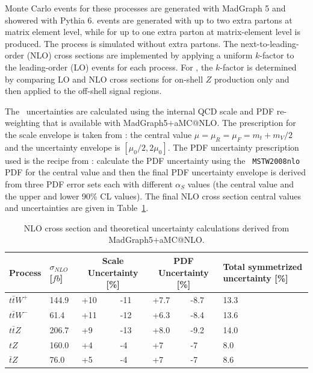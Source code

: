 Monte Carlo events for these processes are generated with MadGraph 5 and showered with Pythia 6.  \ttW events are generated with up to two extra partons at matrix element level, while for \ttZ up to one extra parton at matrix-element level is produced.  The \tZ process is simulated without extra partons.  The next-to-leading-order (NLO) cross sections are implemented by applying a uniform $k$-factor to the leading-order (LO) events for each process.  For \ttZ, the $k$-factor is determined by comparing LO and NLO cross sections for on-shell $Z$ production only and then applied to the off-shell signal regions.  

The \ttV\ uncertainties are calculated
using the internal QCD scale and PDF re-weighting that is available with
 MadGraph5$+$aMC@NLO. The prescription for the scale envelope is taken from
\cite{Garzelli:2012bn}: the central value $\mu=\mu_{R}=\mu_{F}=m_t+m_V/2$
and the uncertainty envelope is $[\mu_{0}/2,2\mu_{0}]$. The PDF
uncertainty prescription used is the recipe from
\cite{Campbell:2012dh}: calculate the PDF uncertainty using the {\tt
MSTW2008nlo}~\cite{Martin:2009iq} PDF for the central value and then the final PDF
uncertainty envelope is derived from three PDF error sets each with
different $\alpha_S$ values (the central value and the upper and lower
90\% CL values). The final NLO cross section central values and
uncertainties are given in Table~\ref{tab:ttVXSunc}.

\begin{table}%
\begin{center}
\caption{NLO cross section and theoretical uncertainty
  calculations derived from MadGraph5$+$aMC@NLO.}
\label{tab:ttVXSunc}
\begin{tabular}{l|p{}|p{}|p{}|p{}|p{}|p{}}
\hline
Process & $\sigma_{NLO}$ [$fb$] & \multicolumn{2}{c|}{Scale
Uncertainty [\%]} & \multicolumn{2}{c|}{PDF Uncertainty [\%]} & Total
symmetrized uncertainty [\%] \\
\hline
\hline
$t\bar{t}W^{+}$ & 144.9 & +10 & -11 & +7.7 & -8.7 & 13.3 \\
$t\bar{t}W^{-}$ & 61.4  & +11 & -12 & +6.3 & -8.4 & 13.6 \\
$t\bar{t}Z$     & 206.7 & +9  & -13 & +8.0 & -9.2 & 14.0 \\
$tZ$            & 160.0 & +4  & -4  & +7   & -7   & 8.0 \\
$\bar{t}Z$      & 76.0  & +5  & -4  & +7   & -7   & 8.6 \\
\hline
\end{tabular}
\end{center}
\end{table}

